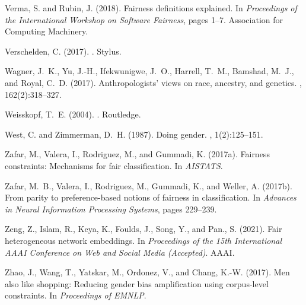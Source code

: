 \documentclass[11pt,dvipdfm]{article}
\begin{document}
\begin{thebibliography}{}
	Verma, S. and Rubin, J. (2018).
	\newblock Fairness definitions explained.
	\newblock In {\em Proceedings of the International Workshop on Software
		Fairness}, pages 1--7. Association for Computing Machinery.
	
	Verschelden, C. (2017).
	.
	\newblock Stylus.
	
	Wagner, J.~K., Yu, J.-H., Ifekwunigwe, J.~O., Harrell, T.~M., Bamshad, M.~J.,
	and Royal, C.~D. (2017).
	\newblock Anthropologists' views on race, ancestry, and genetics.
	, 162(2):318--327.
	
	Weisskopf, T.~E. (2004).
	.
	\newblock Routledge.
	
	West, C. and Zimmerman, D.~H. (1987).
	\newblock Doing gender.
	, 1(2):125--151.
	
	Zafar, M., Valera, I., Rodriguez, M., and Gummadi, K. (2017a).
	\newblock Fairness constraints: Mechanisms for fair classification.
	\newblock In {\em AISTATS}.
	
	Zafar, M.~B., Valera, I., Rodriguez, M., Gummadi, K., and Weller, A. (2017b).
	\newblock From parity to preference-based notions of fairness in
	classification.
	\newblock In {\em Advances in Neural Information Processing Systems}, pages
	229--239.
	
	Zeng, Z., Islam, R., Keya, K., Foulds, J., Song, Y., and Pan., S. (2021).
	\newblock Fair heterogeneous network embeddings.
	\newblock In {\em Proceedings of the 15th International AAAI Conference on Web
		and Social Media (Accepted)}. AAAI.
	
	Zhao, J., Wang, T., Yatskar, M., Ordonez, V., and Chang, K.-W. (2017).
	\newblock Men also like shopping: Reducing gender bias amplification using
	corpus-level constraints.
	\newblock In {\em Proceedings of EMNLP}.
	
\end{thebibliography}
\end{document}
